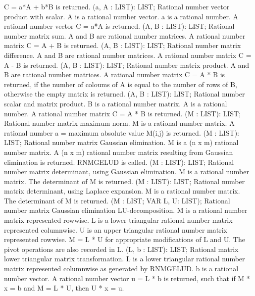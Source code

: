 C = a*A + b*B is returned.  \ecom 
{} (a, A : LIST): LIST; \eproc
\bcom Rational number vector product with scalar. A is a rational
number vector. a is a rational number. A rational number vector
C = a*A is returned.  \ecom 
{} (A, B : LIST): LIST; \eproc
\bcom Rational number matrix sum. A and B are rational number
matrices. A rational number matrix C = A + B is returned.  \ecom 
{} (A, B : LIST): LIST; \eproc
\bcom Rational number matrix difference. A and B are rational number
matrices. A rational number matrix C = A - B is returned.  \ecom 
{} (A, B : LIST): LIST; \eproc
\bcom Rational number matrix product. A and B are rational number
matrices. A rational number matrix C = A * B is returned, if 
the number of coloums of A is equal to the number of rows of B, 
otherwise the empty matrix is returned.  \ecom 
{} (A, B : LIST): LIST; \eproc
\bcom Rational number scalar and matrix product. B is a rational
number matrix. A is a rational number. A rational number matrix 
C = A * B is returned.  \ecom 
{} (M : LIST): LIST; \eproc
\bcom Rational number matrix maximum norm. M is a rational number
matrix. A rational number a = maximum absolute value M(i,j) 
is returned.  \ecom 
{} (M : LIST): LIST; \eproc
\bcom Rational number matrix Gaussian elimination. M is a (n x m)
rational number matrix. A (n x m) rational number matrix
resulting from Gaussian elimination is returned.  
RNMGELUD is called.  \ecom 
{} (M : LIST): LIST; \eproc
\bcom Rational number matrix determinant, using Gaussian elimination.
M is a rational number matrix. The determinant of M is returned.  \ecom 
{} (M : LIST): LIST; \eproc
\bcom Rational number matrix determinant, using Laplace expansion.
M is a rational number matrix. The determinant of M is returned.  \ecom 
{} (M : LIST; VAR L, U: LIST); \eproc
\bcom Rational number matrix Gaussian elimination LU-decomposition.
M is a rational number matrix represented rowwise. L is a lower 
triangular rational number matrix represented columnwise.
U is an upper triangular rational number matrix represented rowwise.
M = L * U for appropriate modifications of L and U. 
The pivot operations are also recorded in L.  \ecom 
{} (L, b : LIST): LIST; \eproc
\bcom Rational matrix lower triangular matrix transformation.
L is a lower triangular rational number matrix represented 
columnwise as generated by RNMGELUD. b is a rational number 
vector. A rational number vector u = L * b is returned, 
such that if M * x = b and M = L * U, then U * x = u.  \ecom 
